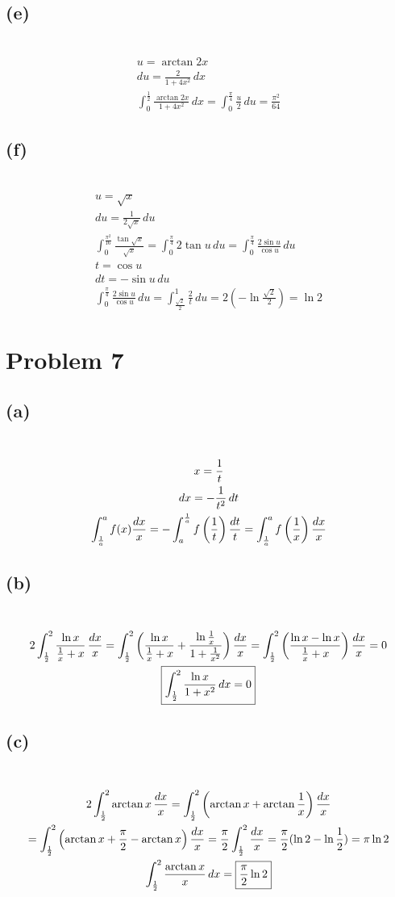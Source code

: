 \documentclass[12pt]{article}
\newcommand*{\paren}[1]{\ensuremath\left(#1\right)}
\newcommand{\problem}[1]{\section{Problem #1}}
\newcommand{\subproblem}[1]{\subsection{(#1)} \,}
\begin{document}
\subproblem{e}
\begin{gather*}
    u=\arctan 2x\\
    du=\frac{2}{1+4x^2}\, dx\\
    \int_0^\frac{1}{2}\frac{\arctan 2x}{1+4x^2} \, dx= \int_0^\frac{\pi}{4} \frac{u}{2}\, du = \boxed{\frac{\pi^2}{64}}
\end{gather*}

\subproblem{f}
\begin{gather*}
    u=\sqrt x\\
    du =\frac{1}{2\sqrt{x}}\, du\\
    \int_0^\frac{\pi^2}{16} \frac{\tan \sqrt{x}}{\sqrt{x}}=\int_0^\frac{\pi}{4} 2\tan u\, du=\int_0^\frac{\pi}{4} \frac{2\sin u}{\cos u}\, du\\
    t=\cos u\\
    dt=-\sin u\, du\\
    \int_0^\frac{\pi}{4} \frac{2\sin u}{\cos u}\, du= \int_\frac{\sqrt{2}}{2}^1\frac{2}{t} \, du = 2 (-\ln \frac{\sqrt{2}}{2})=\boxed{\ln 2}
\end{gather*}

\problem{7}

\subproblem{a}
\begin{gather*}
    x=\frac{1}{t}\\
    dx=-\frac{1}{t^2}\,dt\\
    \int_\frac{1}{a}^af(x)\frac{dx}{x}= -\int_a^\frac{1}{a}f\paren{\frac{1}{t}} \frac{dt}{t}=\int_\frac{1}{a}^af\paren{\frac{1}{x}}\frac{dx}{x}
\end{gather*}

\subproblem{b}
\begin{gather*}
    2\int_\frac{1}{2}^2\frac{\ln x}{\frac{1}{x}+x}\, \frac{dx}{x} =\int_\frac{1}{2}^2 \paren{\frac{\ln x}{\frac{1}{x}+x} + \frac{\ln \frac{1}{x}}{1+\frac{1}{x^2}}} \frac{dx}{x}=\int_\frac{1}{2}^2 \paren{\frac{\ln x - \ln x}{\frac{1}{x}+x}}\frac{dx}{x}=0\\
    \boxed{\int_\frac{1}{2}^2\frac{\ln x}{1+x^2}\, dx=0}
\end{gather*}

\subproblem{c}
\begin{gather*}
    2 \int_\frac{1}{2}^2 \arctan x\, \frac{dx}{x} = \int_\frac{1}{2}^2 \paren{\arctan x +\arctan \frac{1}{x}} \frac{dx}{x} \\= \int_\frac{1}{2}^2 \paren{\arctan x + \frac{\pi}{2}-\arctan x} \frac{dx}{x}= \frac{\pi}{2}\int_\frac{1}{2}^2 \frac{dx}{x}= \frac{\pi}{2} (\ln 2 - \ln \frac{1}{2}) = \pi \ln 2\\
    \int_\frac{1}{2}^2 \frac{\arctan x}{x} \, dx = \boxed{\frac{\pi}{2} \ln 2}
\end{gather*}
\end{document}
